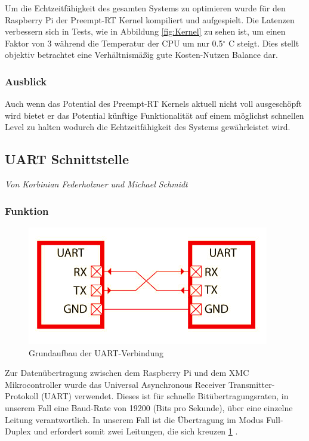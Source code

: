 \documentclass[12pt,a4paper,bibliography=totoc,listof=totoc]{scrartcl}
\begin{document}
Um die Echtzeitfähigkeit des gesamten Systems zu optimieren wurde für den Raspberry Pi der Preempt-RT Kernel kompiliert und aufgespielt.
Die Latenzen verbessern sich in Tests, wie in Abbildung \ref{fig:Kernel} zu sehen ist, 
um einen Faktor von 3 während die Temperatur der CPU um nur 0.5$^\circ$ C steigt. Dies stellt objektiv betrachtet eine
Verhältnismäßig gute Kosten-Nutzen Balance dar.
\subsubsection{Ausblick}
Auch wenn das Potential des Preempt-RT Kernels aktuell nicht voll ausgeschöpft wird bietet er das Potential künftige Funktionalität auf einem 
möglichst schnellen Level zu halten wodurch die Echtzeitfähigkeit des Systems gewährleistet wird.

\subsection{UART Schnittstelle}
\textit{Von Korbinian Federholzner und Michael Schmidt}\newline
\subsubsection{Funktion}
\begin{figure}[htbp]
	\centering
	\includegraphics[scale = 0.6]{pics/BildUart1}
	\caption{Grundaufbau der UART-Verbindung} 
	\label{fig:UART}
\end{figure}
Zur Datenübertragung zwischen dem Raspberry Pi und dem XMC Mikrocontroller wurde das Universal 
Asynchronous Receiver Transmitter-Protokoll (UART) verwendet. Dieses ist für schnelle Bitübertragungsraten, 
in unserem Fall eine Baud-Rate von 19200 (Bits pro Sekunde), über eine einzelne Leitung verantwortlich. 
In unserem Fall ist die Übertragung im Modus Full-Duplex und erfordert somit zwei Leitungen, die sich 
kreuzen \ref{fig:UART} \cite {mikroe}.
\end{document}
